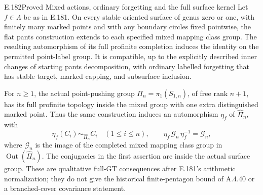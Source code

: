 \begin{result}{E.182}{Proved}
{Mixed actions, ordinary forgetting and the full surface kernel}
Let \(f\in\Lambda\) be as in E.181.
On every stable oriented surface of genus zero or one, with
finitely many marked points and with any boundary circles
fixed pointwise, the flat pants construction extends to
each specified mixed mapping class group.
The resulting automorphism of its full profinite completion
induces the identity on the permitted point-label group.
It is compatible, up to the explicitly described inner
changes of starting pants decomposition, with ordinary
labelled forgetting that has stable target, marked capping,
and subsurface inclusion.

For \(n\geq1\), the actual point-pushing group
\(\Pi_n=\pi_1(S_{1,n})\), of free rank \(n+1\), has its full
profinite topology inside the mixed group with one extra
distinguished marked point.  Thus the same construction
induces an automorphism \(\eta_f\) of
\(\widehat\Pi_n\), with
\[
 \eta_f(C_i)\sim_{\widehat\Pi_n} C_i\quad(1\leq i\leq n),
 \qquad
 \eta_f\,\mathscr G_n\,\eta_f^{-1}=\mathscr G_n,
\tag{E.182.1}
\]
where \(\mathscr G_n\) is the image of the completed mixed
mapping class group in \(\operatorname{Out}(\widehat\Pi_n)\).
The conjugacies in the first assertion are inside the actual
surface group.  These are qualitative full-GT consequences
after E.181's arithmetic normalization; they do not give
the historical finite-pentagon bound of A.4.40 or a
branched-cover covariance statement.
\end{result}

